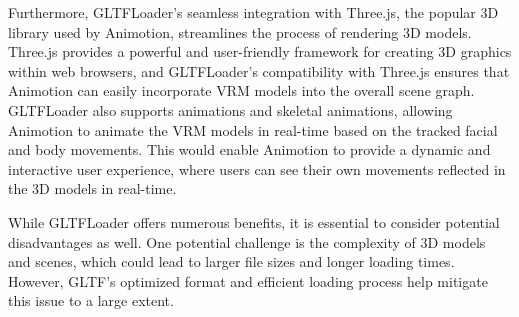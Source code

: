 Furthermore, GLTFLoader's seamless integration with Three.js, the popular 3D library used by 
Animotion, streamlines the process of rendering 3D models. Three.js provides a powerful and user-friendly framework 
for creating 3D graphics within web browsers, and GLTFLoader's compatibility with Three.js ensures that Animotion 
can easily incorporate VRM models into the overall scene graph. GLTFLoader also supports animations and skeletal animations, allowing Animotion to animate the 
VRM models in real-time based on the tracked facial and body movements. This would enable Animotion to provide 
a dynamic and interactive user experience, where users can see their own movements reflected in the 3D models in real-time. \cite{GLTFLoaderWithVRM}

While GLTFLoader offers numerous benefits, it is essential to consider potential disadvantages as well. 
One potential challenge is the complexity of 3D models and scenes, which could lead to larger file sizes 
and longer loading times. However, GLTF's optimized format and efficient loading process help mitigate this issue to a large extent.

